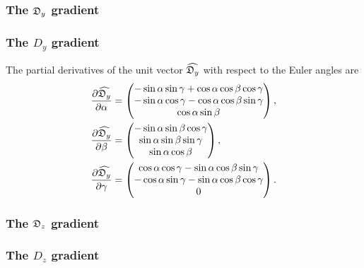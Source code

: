 \begin{latexonly}
    \subsubsection{The $\mathfrak{D}_y$ gradient}
\end{latexonly}
\begin{htmlonly}
    \subsubsection{The $D_y$ gradient}
\end{htmlonly}

The partial derivatives of the unit vector $\widehat{\mathfrak{D}_y}$ with respect to the Euler angles are
\begin{subequations}
\begin{align}
    \frac{\partial \widehat{\mathfrak{D}_y}}{\partial \alpha} &= \begin{pmatrix}
        -\sin \alpha \sin \gamma + \cos \alpha \cos \beta \cos \gamma \\
        -\sin \alpha \cos \gamma - \cos \alpha \cos \beta \sin \gamma \\
        \cos \alpha \sin \beta \\
    \end{pmatrix}, \\
    \frac{\partial \widehat{\mathfrak{D}_y}}{\partial \beta} &= \begin{pmatrix}
        -\sin \alpha \sin \beta \cos \gamma \\
        \sin \alpha \sin \beta \sin \gamma \\
        \sin \alpha \cos \beta \\
    \end{pmatrix}, \\
    \frac{\partial \widehat{\mathfrak{D}_y}}{\partial \gamma} &= \begin{pmatrix}
        \cos \alpha \cos \gamma - \sin \alpha \cos \beta \sin \gamma \\
        -\cos \alpha \sin \gamma - \sin \alpha \cos \beta \cos \gamma \\
        0 \\
    \end{pmatrix}.
\end{align}
\end{subequations}



\begin{latexonly}
    \subsubsection{The $\mathfrak{D}_z$ gradient}
\end{latexonly}
\begin{htmlonly}
    \subsubsection{The $D_z$ gradient}
\end{htmlonly}

